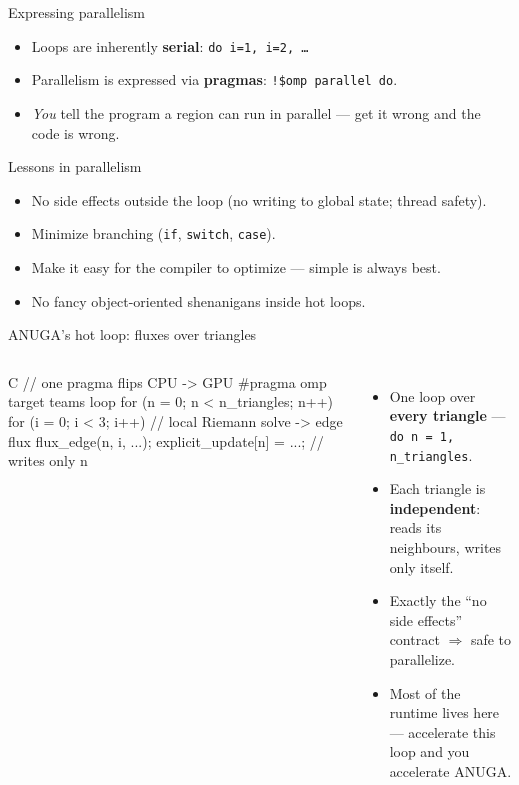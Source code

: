 \documentclass[aspectratio=169]{beamer}
\begin{document}
\begin{frame}{Expressing parallelism}
  \begin{itemize}
    \item Loops are inherently \textbf{serial}: \texttt{do i=1, i=2, \dots}
    \item Parallelism is expressed via \textbf{pragmas}: \texttt{!\$omp parallel do}.
    \item \emph{You} tell the program a region can run in parallel --- get it wrong and the code is wrong.
  \end{itemize}
  \begin{block}{Lessons in parallelism}
    \begin{itemize}
      \item No side effects outside the loop (no writing to global state; thread safety).
      \item Minimize branching (\texttt{if}, \texttt{switch}, \texttt{case}).
      \item Make it easy for the compiler to optimize --- simple is always best.
      \item No fancy object-oriented shenanigans inside hot loops.
    \end{itemize}
  \end{block}
\end{frame}

\begin{frame}[fragile]{ANUGA's hot loop: fluxes over triangles}
  \begin{columns}[T,onlytextwidth]
      \begin{cookiecode}[title={compute\_fluxes --- the main kernel}]{C}
// one pragma flips CPU -> GPU
#pragma omp target teams loop
for (n = 0; n < n_triangles; n++) {
  for (i = 0; i < 3; i++) {
    // local Riemann solve -> edge flux
    flux_edge(n, i, ...);
  }
  explicit_update[n] = ...;       // writes only n
}
      \end{cookiecode}
      \begin{itemize}
        \item One loop over \textbf{every triangle} --- \texttt{do n = 1, n\_triangles}.
        \item Each triangle is \textbf{independent}: reads its neighbours, writes only itself.
        \item Exactly the ``no side effects'' contract $\Rightarrow$ safe to parallelize.
        \item Most of the runtime lives here --- accelerate this loop and you accelerate ANUGA.
      \end{itemize}
  \end{columns}
\end{frame}
\end{document}
